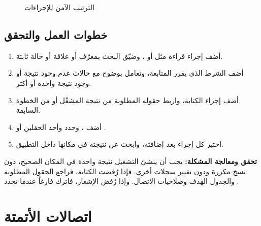 \begin{figure}[H]
\centering
{}
\rclegend
\caption{الترتيب الآمن للإجراءات}
\label{fig:builder-sops-actions-flow}
\end{figure}

\subsection{خطوات العمل والتحقق}
\begin{enumerate}
\item أضف إجراء قراءة مثل  أو ، وضيّق البحث بمعرّف أو علاقة أو حالة ثابتة.
\item أضف الشرط الذي يقرر المتابعة، وتعامل بوضوح مع حالات عدم وجود نتيجة أو وجود نتيجة واحدة أو أكثر.
\item أضف إجراء الكتابة، واربط حقوله المطلوبة من نتيجة المشغّل أو من الخطوة السابقة.
\item أضف ، وحدد  وأحد الحقلين  أو .
\item اختبر كل إجراء بعد إضافته، وابحث عن نتيجته في مكانها داخل التطبيق.
\end{enumerate}

\textbf{تحقق ومعالجة المشكلة:} يجب أن ينشئ التشغيل نتيجة واحدة في المكان الصحيح، دون نسخ مكررة ودون تغيير سجلات أخرى. فإذا رُفضت الكتابة، فراجع الحقول المطلوبة والجدول الهدف وصلاحيات الاتصال. وإذا رُفض الإشعار، فاترك  فارغاً عندما تحدد .

\clearpage
\section{اتصالات الأتمتة}
\label{sec:builder-feature-sops-connections}

